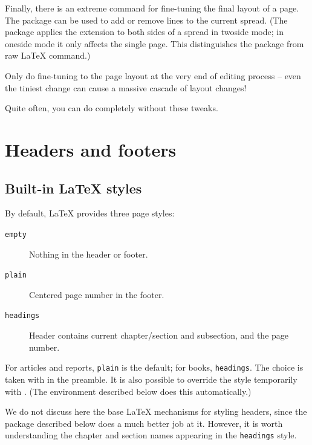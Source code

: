 Finally, there is an extreme command for fine-tuning the final layout of a page.
The  package can be used to add or remove lines to the current spread.
(The package applies the extension to both sides of a spread in twoside mode;
in oneside mode it only affects the single page.
This distinguishes the package from raw \LaTeX{}  command.)

\begin{warning}
Only do fine-tuning to the page layout at the very end of editing process
-- even the tiniest change can cause a massive cascade of layout changes!

Quite often, you can do completely without these tweaks.
\end{warning}


%
%
%
\section{Headers and footers}

\subsection{Built-in \LaTeX{} styles}\label{sec:marking}

By default, \LaTeX{} provides three page styles:
%
\begin{description}
\item[\texttt{empty}] Nothing in the header or footer.
\item[\texttt{plain}] Centered page number in the footer.
\item[\texttt{headings}] Header contains current chapter/section and subsection, and the page number.
\end{description}
%
For articles and reports, \verb|plain| is the default;
for books, \verb|headings|.
The choice is taken with  in the preamble.
It is also possible to override the style temporarily with .
(The  environment described below does this automatically.)

We do not discuss here the base \LaTeX{} mechanisms for styling headers,
since the  package described below does a much better job at it.
However, it is worth understanding the chapter and section names appearing in the \verb|headings| style.

